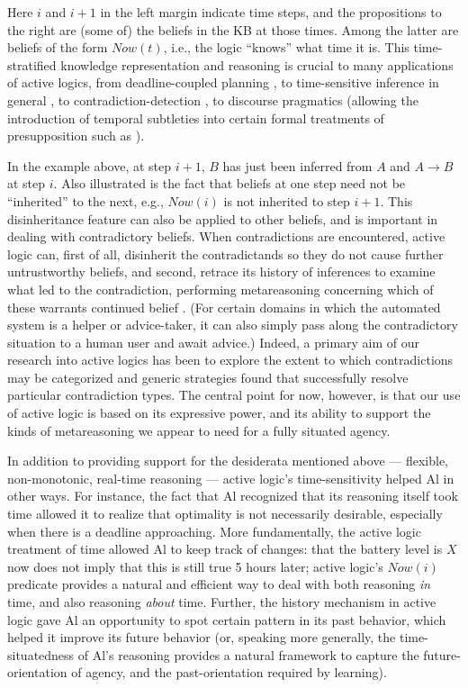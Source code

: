 \documentclass{llncs}
\begin{document}
\noindent Here $i$ and $i+1$ in the left margin indicate time steps, and
the propositions to the right are (some of) the beliefs in the KB at those
times. Among the latter are beliefs of the form $\mathit{Now}(t)$, i.e.,
the logic ``knows'' what time it is. This time-stratified knowledge
representation and reasoning is crucial to many applications of active
logics, from deadline-coupled planning
\cite{nirkhe/kraus/miller/perlis:how}, to time-sensitive inference in
general \cite {elgot-drapkin/perlis:reasoning:jetai}, to
contradiction-detection \cite {miller/perlis:presentations}, to discourse
pragmatics \cite {gurney/perlis/purang:interpreting,Traum_ETAI} (allowing
the introduction of temporal subtleties into certain formal treatments of
presupposition such as \cite {heim:presupposition}).
 
In the example above, at step $i+1$, $B$ has just been inferred from $A$
and $A \rightarrow B$ at step $i$.  Also illustrated is the fact that
beliefs at one step need not be ``inherited'' to the next, e.g.,
$\mathit{Now}(i)$ is not inherited to step $i+1$. This disinheritance
feature can also be applied to other beliefs, and is important in dealing
with contradictory beliefs. When contradictions are encountered, active
logic can, first of all, disinherit the contradictands so they do not cause
further untrustworthy beliefs, and second, retrace its history of
inferences to examine what led to the contradiction, performing
metareasoning concerning which of these warrants continued belief
\cite{miller/perlis:presentations,gurney/perlis/purang:interpreting}.  (For
certain domains in which the automated system is a helper or advice-taker,
it can also simply pass along the contradictory situation to a human user
and await advice.) Indeed, a primary aim of our research into active logics
has been to explore the extent to which contradictions may be categorized
and generic strategies found that successfully resolve particular
contradiction types.  The central point for now, however, is that our use
of active logic is based on its expressive power, and its ability to
support the kinds of metareasoning we appear to need for a fully situated
agency.

In addition to providing support for the desiderata mentioned
above --- flexible, non-monotonic, real-time reasoning --- active logic's
time-sensitivity helped Al in other ways. For instance, the fact that Al
recognized that its reasoning itself took time allowed it to realize that
optimality is not necessarily desirable, especially when there is a
deadline approaching. More fundamentally, the active logic treatment of
time allowed Al to keep track of changes: that the battery level is \( X \)
now does not imply that this is still true 5 hours later; active logic's \(
\mathit{Now}(i) \) predicate provides a natural and efficient way to deal
with both reasoning {\em in} time, and also reasoning {\em about} time.
Further, the history mechanism in active logic gave Al an opportunity to
spot certain pattern in its past behavior, which helped it improve its
future behavior (or, speaking more generally, the time-situatedness of Al's
reasoning provides a natural framework to capture the future-orientation of
agency, and the past-orientation required by learning).
\end{document}
